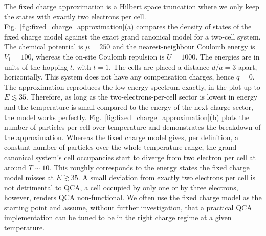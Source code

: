 The fixed charge approximation is a Hilbert space truncation where we only keep
the states with exactly two electrons per cell.
Fig.~\ref{fig:fixed_charge_approximation}(a) compares the density of states of
the fixed charge model against the exact grand canonical model for a two-cell
system. The chemical potential is $\mu = 250$ and the nearest-neighbour Coulomb
energy is $V_1 = 100$, whereas the on-site Coulomb repulsion is $U = 1000$. The
energies are in units of the hopping $t$, with $t = 1$. The cells are placed a
distance $d/a = 3$ apart, horizontally. This system does not have any
compensation charges, hence $q = 0$. The approximation reproduces the low-energy
spectrum exactly, in the plot up to $E \lesssim 35$. Therefore, as long as the
two-electrons-per-cell sector is lowest in energy and the temperature is small
compared to the energy of the next charge sector, the model works perfectly.
Fig.~\ref{fig:fixed_charge_approximation}(b) plots the number of particles per
cell over temperature and demonstrates the breakdown of the approximation.
Whereas the fixed charge model gives, per definition, a constant number of
particles over the whole temperature range, the grand canonical system's cell
occupancies start to diverge from two electron per cell at around $T \sim 10$.
This roughly corresponds to the energy states the fixed charge model misses at
$E \gtrsim 35$. A small deviation from exactly two electrons per cell is not
detrimental to QCA, a cell occupied by only one or by three electrons, however,
renders QCA non-functional. We often use the fixed charge model as the starting
point and assume, without further investigation, that a practical QCA
implementation can be tuned to be in the right charge regime at a given
temperature.

